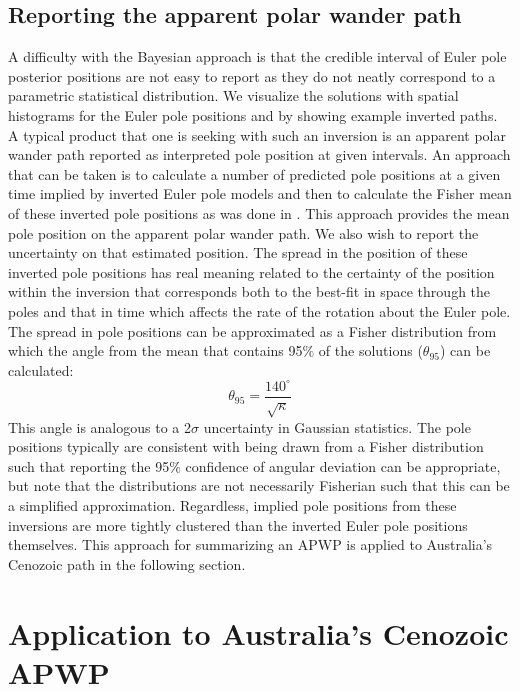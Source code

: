 \documentclass[11pt,letterpaper]{article}
\begin{document}
\subsection*{Reporting the apparent polar wander path}
\label{sec:age_uncertainty}
A difficulty with the Bayesian approach is that the credible interval of Euler pole posterior positions are not easy to report as they do not neatly correspond to a parametric statistical distribution. We visualize the solutions with spatial histograms for the Euler pole positions and by showing example inverted paths. A typical product that one is seeking with such an inversion is an apparent polar wander path reported as interpreted pole position at given intervals. An approach that can be taken is to calculate a number of predicted pole positions at a given time implied by inverted Euler pole models and then to calculate the Fisher mean of these inverted pole positions as was done in \citet{Swanson-Hysell2019a}. This approach provides the mean pole position on the apparent polar wander path. We also wish to report the uncertainty on that estimated position. The spread in the position of these inverted pole positions has real meaning related to the certainty of the position within the inversion that corresponds both to the best-fit in space through the poles and that in time which affects the rate of the rotation about the Euler pole. The spread in pole positions can be approximated as a Fisher distribution from which the angle from the mean that contains 95$\%$ of the solutions ($\theta_{95}$) can be calculated:
\begin{equation}
\theta_{95}=\frac{140^{\circ}}{\sqrt{\kappa}}
\label{eq:angular_deviation}
\end{equation}
This angle is analogous to a 2$\sigma$ uncertainty in Gaussian statistics.  The pole positions typically are consistent with being drawn from a Fisher distribution such that reporting the 95$\%$ confidence of angular deviation can be appropriate, but note that the distributions are not necessarily Fisherian such that this can be a simplified approximation. Regardless, implied pole positions from these inversions are more tightly clustered than the inverted Euler pole positions themselves. This approach for summarizing an APWP is applied to Australia's Cenozoic path in the following section.

\section*{Application to Australia's Cenozoic APWP}
\label{sec:australia}
\end{document}

